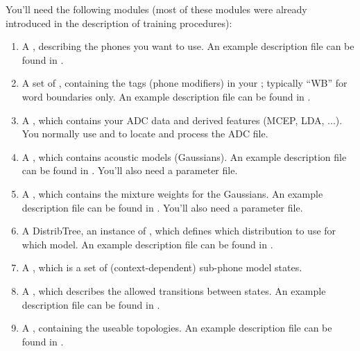 You'll need the following modules  (most of these modules were already
introduced in the description of training procedures):

\begin{enumerate}

\item A  , describing the  phones you  want to
use.   An      example    description  file      can   be   found   in
.

\item A  set   of  , containing the    tags  (phone
modifiers)  in  your  ; typically  ``WB'' for
word boundaries   only. An example  description file  can  be found in
.

\item A ,  which  contains your ADC data  and
derived   features   (MCEP,    LDA,    ...).     You  normally     use
   and    to locate  and
process the ADC file.

\item A ,   which  contains acoustic  models
(Gaussians).    An  example description    file     can be  found   in
. You'll also need a parameter file.

\item A ,  which contains the mixture weights
for the   Gaussians.  An example   description  file can  be found  in
. You'll also need a parameter file.

\item A DistribTree, an instance of , which defines
which distribution   to use for  which  model.  An example description
file can be found in .

\item    A      ,  which   is    a      set of
(context-dependent) sub-phone model states.

\item A  , which describes the allowed transitions
between states.  An example description  file can be found in
.

\item A , containing the useable topologies.  An
example description file can be found in .


\end{enumerate}
